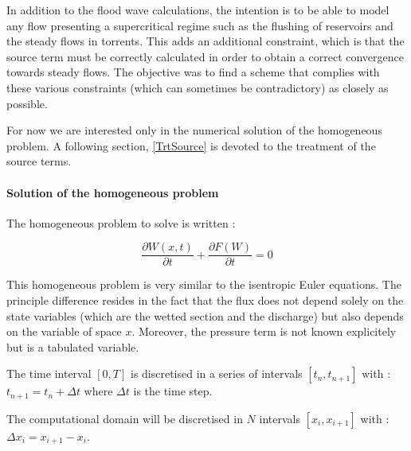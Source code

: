 \vspace{0.5cm}

In addition to the flood wave calculations, the intention is to be able to model any flow presenting a supercritical regime such as the flushing of reservoirs and the steady flows in torrents. This adds an additional constraint, which is that the source term must be correctly calculated in order to obtain a correct convergence towards steady flows. The objective was to find a scheme that complies with these various constraints (which can sometimes be contradictory) as closely as possible.
\vspace{0.5cm}

For now we are interested only in the numerical solution of the homogeneous problem. A following section, \ref{TrtSource} is devoted to the treatment of the source terms.

\paragraph{Solution of the homogeneous problem\\}

\hspace*{1cm}

\label{PbHom}

The homogeneous problem to solve is written :

\begin{equation}
 \frac{\partial W(x,t)}{\partial t} + \frac{\partial F(W)}{\partial t} = 0
\end{equation}

\vspace{0.5cm}

This homogeneous problem is very similar to the isentropic Euler equations. The principle difference resides in the fact that the flux does not depend solely on the state variables (which are the wetted section and the discharge) but also depends on the variable of space $x$. Moreover, the pressure term is not known explicitely but is a tabulated variable.

\vspace{0.5cm}

The time interval $[0,T]$ is discretised in a series of intervals $[t_n , t_{n+1}]$ with : $t_{n+1} = t_n + \Delta t$ where $\Delta t$ is the time step.

\vspace{0.5cm}

The computational domain will be discretised in $N$ intervals $[x_i , x_{i+1}]$ with : $\Delta x_i = x_{i+1} - x_i$.

